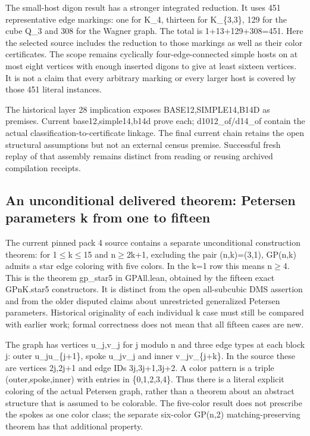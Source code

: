 \documentclass[11pt,a4paper]{article}
\begin{document}
The small-host digon result has a stronger integrated reduction. It uses 451 representative edge markings: one for K\_4, thirteen for K\_\{3,3\}, 129 for the cube Q\_3 and 308 for the Wagner graph. The total is 1+13+129+308=451. Here the selected source includes the reduction to those markings as well as their color certificates. The scope remains cyclically four-edge-connected simple hosts on at most eight vertices with enough inserted digons to give at least sixteen vertices. It is not a claim that every arbitrary marking or every larger host is covered by those 451 literal instances.

The historical layer 28 implication exposes BASE12,SIMPLE14,B14D as premises. Current base12,simple14,b14d prove each; d1012\_of/d14\_of contain the actual classification-to-certificate linkage. The final current chain retains the open structural assumptions but not an external census premise. Successful fresh replay of that assembly remains distinct from reading or reusing archived compilation receipts.

\subsection{An unconditional delivered theorem: Petersen parameters k from one to fifteen}
The current pinned pack 4 source contains a separate unconditional construction theorem: for 1\ensuremath{\leq}k\ensuremath{\leq}15 and n\ensuremath{\geq}2k+1, excluding the pair (n,k)=(3,1), GP(n,k) admits a star edge coloring with five colors. In the k=1 row this means n\ensuremath{\geq}4. This is the theorem gp\_star5 in GPAll.lean, obtained by the fifteen exact GPnK.star5 constructors. It is distinct from the open all-subcubic DMS assertion and from the older disputed claims about unrestricted generalized Petersen parameters. Historical originality of each individual k case must still be compared with earlier work; formal correctness does not mean that all fifteen cases are new.

The graph has vertices u\_j,v\_j for j modulo n and three edge types at each block j: outer u\_ju\_\{j+1\}, spoke u\_jv\_j and inner v\_jv\_\{j+k\}. In the source these are vertices 2j,2j+1 and edge IDs 3j,3j+1,3j+2. A color pattern is a triple (outer,spoke,inner) with entries in \{0,1,2,3,4\}. Thus there is a literal explicit coloring of the actual Petersen graph, rather than a theorem about an abstract structure that is assumed to be colorable. The five-color result does not prescribe the spokes as one color class; the separate six-color GP(n,2) matching-preserving theorem has that additional property.
\end{document}
